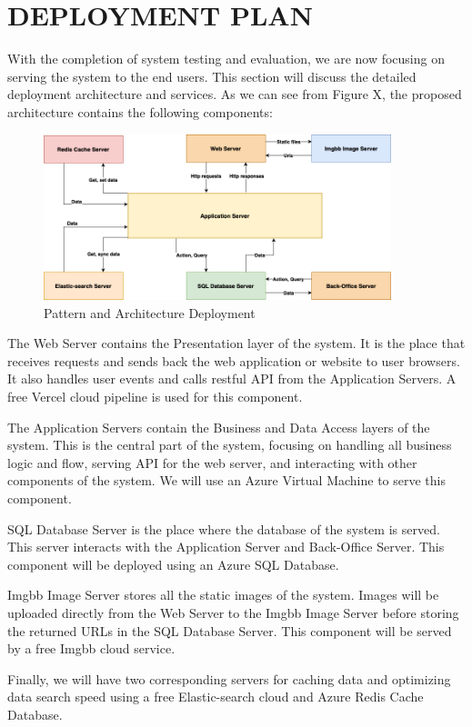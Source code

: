 \chapter{DEPLOYMENT PLAN} 
With the completion of system testing and evaluation, we are now 
focusing on serving the system to the end users. This section will 
discuss the detailed deployment architecture and services. As we 
can see from Figure X, the proposed architecture contains the 
following components:
\begin{figure}[H]
    \centering
    \includegraphics[width=0.9\textwidth]{Figures/Deployment/Pattern and Architecture-Deployment.drawio.png}
    \caption{Pattern and Architecture Deployment}
    \label{fig:deployment-architecture}
\end{figure}
The Web Server contains the Presentation layer of the system. It is the place that receives requests and sends 
back the web application or website to user browsers. It also 
handles user events and calls restful API from the Application 
Servers. A free Vercel cloud pipeline is used for this component.

The Application Servers contain the Business and Data Access layers 
of the system. This is the central part of the system, focusing on 
handling all business logic and flow, serving API for the web server, 
and interacting with other components of the system. We will use an Azure 
Virtual Machine to serve this component.

SQL Database Server is the place where the database of the system is served. 
This server interacts with the Application Server and Back-Office Server. 
This component will be deployed using an Azure SQL Database.

Imgbb Image Server stores all the static images of the system. Images will 
be uploaded directly from the Web Server to the Imgbb Image Server before 
storing the returned URLs in the SQL Database Server. This component will 
be served by a free Imgbb cloud service.

Finally, we will have two corresponding servers for caching data and optimizing 
data search speed using a free Elastic-search cloud and Azure Redis Cache Database.
